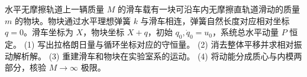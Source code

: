 水平无摩擦轨道上一辆质量 \(M\) 的滑车载有一块可沿车内无摩擦直轨道滑动的质量 \(m\) 的物块。物块通过水平理想弹簧 \(k\) 与滑车相连，弹簧自然长度对应相对坐标 \(q=0\)。滑车坐标为 \(X\)，物块坐标 \(X+q\)，初始 \(q_0,\dot q_0=u_0\)，系统总水平动量 \(P\) 恒定。
(1) 写出拉格朗日量与循环坐标对应的守恒量。
(2) 消去整体平移并求相对振动解析解。
(3) 重建滑车和物块在实验室系的运动。
(4) 将动能分成质心与内模两部分，核验 \(M\to\infty\) 极限。
